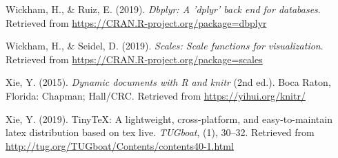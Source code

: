 \documentclass[
  english,
  man]{apa6}
\begin{document}
\leavevmode\hypertarget{ref-R-dbplyr}{}%
Wickham, H., \& Ruiz, E. (2019). \emph{Dbplyr: A 'dplyr' back end for databases}. Retrieved from \url{https://CRAN.R-project.org/package=dbplyr}

\leavevmode\hypertarget{ref-R-scales}{}%
Wickham, H., \& Seidel, D. (2019). \emph{Scales: Scale functions for visualization}. Retrieved from \url{https://CRAN.R-project.org/package=scales}

\leavevmode\hypertarget{ref-R-knitr}{}%
Xie, Y. (2015). \emph{Dynamic documents with R and knitr} (2nd ed.). Boca Raton, Florida: Chapman; Hall/CRC. Retrieved from \url{https://yihui.org/knitr/}

\leavevmode\hypertarget{ref-R-tinytex}{}%
Xie, Y. (2019). TinyTeX: A lightweight, cross-platform, and easy-to-maintain latex distribution based on tex live. \emph{TUGboat}, (1), 30--32. Retrieved from \url{http://tug.org/TUGboat/Contents/contents40-1.html}

\endgroup
\end{document}
